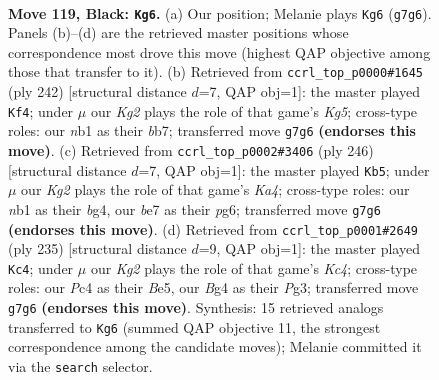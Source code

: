 \documentclass[11pt]{article}
\begin{document}
\clearpage

\begin{figure}[p]\centering
\begin{subfigure}{0.46\textwidth}\centering
\resizebox{\linewidth}{!}{%
\newchessgame
\chessboard[
  setfen={8/4B1k1/8/8/p1p3b1/8/5K2/1N6 b - - 93 119},
  showmover=false,
  pgfstyle=straightmove, color=movearrow, markmove={g7-g6}
]}
\caption{}
\end{subfigure}\hfill
\begin{subfigure}{0.46\textwidth}\centering
\resizebox{\linewidth}{!}{%
\newchessgame
\chessboard[
  setfen={5B2/Pb6/4k3/2P3K1/8/8/8/8 w - - 13 122},
  showmover=false,
  pgfstyle=straightmove, color=movearrow, markmove={g5-f4}
]}
\caption{}
\end{subfigure}
\\[4pt]
\begin{subfigure}{0.46\textwidth}\centering
\resizebox{\linewidth}{!}{%
\newchessgame
\chessboard[
  setfen={3k4/8/2P3p1/8/K1P3bP/8/8/2B5 w - - 1 124},
  showmover=false,
  pgfstyle=straightmove, color=movearrow, markmove={a4-b5}
]}
\caption{}
\end{subfigure}\hfill
\begin{subfigure}{0.46\textwidth}\centering
\resizebox{\linewidth}{!}{%
\newchessgame
\chessboard[
  setfen={8/8/8/2k1b3/4B3/6pp/8/5K2 b - - 77 118},
  showmover=false,
  pgfstyle=straightmove, color=movearrow, markmove={c5-c4}
]}
\caption{}
\end{subfigure}
\caption{\textbf{Move 119, Black: \texttt{Kg6}.} (a) Our position; Melanie plays \texttt{Kg6} (\texttt{g7g6}). Panels (b)--(d) are the retrieved master positions whose correspondence most drove this move (highest QAP objective among those that transfer to it). (b) Retrieved from \texttt{ccrl\_top\_p0000\#1645} (ply 242) [structural distance $d$=7, QAP obj=1]: the master played \texttt{Kf4}; under $\mu$ our \emph{Kg2} plays the role of that game's \emph{Kg5}; cross-type roles: our \emph{n}b1 as their \emph{b}b7; transferred move \texttt{g7g6} \textbf{(endorses this move)}. (c) Retrieved from \texttt{ccrl\_top\_p0002\#3406} (ply 246) [structural distance $d$=7, QAP obj=1]: the master played \texttt{Kb5}; under $\mu$ our \emph{Kg2} plays the role of that game's \emph{Ka4}; cross-type roles: our \emph{n}b1 as their \emph{b}g4, our \emph{b}e7 as their \emph{p}g6; transferred move \texttt{g7g6} \textbf{(endorses this move)}. (d) Retrieved from \texttt{ccrl\_top\_p0001\#2649} (ply 235) [structural distance $d$=9, QAP obj=1]: the master played \texttt{Kc4}; under $\mu$ our \emph{Kg2} plays the role of that game's \emph{Kc4}; cross-type roles: our \emph{P}c4 as their \emph{B}e5, our \emph{B}g4 as their \emph{P}g3; transferred move \texttt{g7g6} \textbf{(endorses this move)}. Synthesis: 15 retrieved analogs transferred to \texttt{Kg6} (summed QAP objective 11, the strongest correspondence among the candidate moves); Melanie committed it via the \texttt{search} selector.}
\label{fig:thought-m237}
\end{figure}
\end{document}
